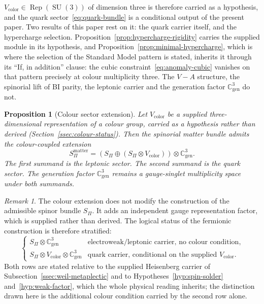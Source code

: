 \documentclass[11pt,a4paper]{article}
\newtheorem{proposition}[theorem]{Proposition}
\theoremstyle{definition}
\theoremstyle{remark}
\newtheorem{remark}[theorem]{Remark}
\newcommand{\SU}{\operatorname{SU}}
\begin{document}
    $V_{\mathrm{color}} \in \operatorname{Rep}(\SU(3))$ of dimension three is therefore carried
    as a hypothesis, and the quark sector~\eqref{eq:quark-bundle} is a conditional output of the
    present paper.
    Two results of this paper rest on it: the quark carrier itself, and the hypercharge selection.
    Proposition~\ref{prop:hypercharge-rigidity} carries the supplied module in its hypothesis, and
    Proposition~\ref{prop:minimal-hypercharge}, which is where the selection of the Standard Model
    pattern is stated, inherits it through its ``If, in addition'' clause: the cubic
    constraint~\eqref{eq:anomaly-cubic} vanishes on that pattern precisely at colour multiplicity
    three.
    The $V{-}A$ structure, the spinorial lift of BI parity, the leptonic carrier and the generation
    factor $\mathbb{C}^3_{\mathrm{gen}}$ do not.

    \begin{proposition}[Colour sector extension]
      \label{prop:colour-extension}
      Let $V_{\mathrm{color}}$ be a supplied three-dimensional representation of a colour group,
      carried as a hypothesis rather than derived (Section~\ref{ssec:colour-status}).
      Then the spinorial matter bundle admits the colour-coupled extension
      \begin{equation}
        \label{eq:colour-extension}
        S_\Pi^{\mathrm{matter}}
        =
        \left(
          S_\Pi \oplus (S_\Pi \otimes V_{\mathrm{color}})
        \right)
        \otimes \mathbb{C}^3_{\mathrm{gen}} .
      \end{equation}
      The first summand is the leptonic sector.
      The second summand is the quark sector.
      The generation factor $\mathbb{C}^3_{\mathrm{gen}}$ remains a gauge-singlet
      multiplicity space under both summands.
    \end{proposition}

    \begin{remark}
      \label{rem:colour-does-not-affect-spinorial-construction}
      The colour extension does not modify the construction of the admissible spinor
      bundle $S_\Pi$.
      It adds an independent gauge representation factor, which is supplied rather than derived.
      The logical status of the fermionic construction is therefore stratified:
      \begin{equation}
        \label{eq:status-table}
        \begin{cases}
          S_\Pi \otimes \mathbb{C}^3_{\mathrm{gen}}
          & \text{electroweak/leptonic carrier, no colour condition,} \\[4pt]
          S_\Pi \otimes V_{\mathrm{color}} \otimes \mathbb{C}^3_{\mathrm{gen}}
          & \text{quark carrier, conditional on the supplied } V_{\mathrm{color}}.
        \end{cases}
      \end{equation}
      Both rows are stated relative to the supplied Heisenberg carrier of
      Subsection~\ref{ssec:weil-metaplectic} and to Hypotheses~\ref{hyp:spin-solder}
      and~\ref{hyp:weak-factor}, which the whole physical reading inherits; the
      distinction drawn here is the additional colour condition carried by the second row alone.
    \end{remark}
\end{document}
